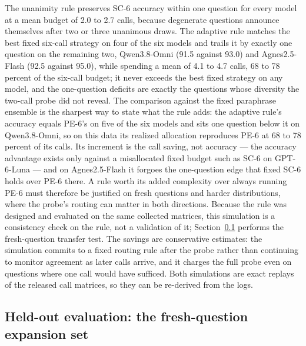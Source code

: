 The unanimity rule preserves SC-6 accuracy within one question for every model at a mean budget of 2.0 to 2.7 calls, because degenerate questions announce themselves after two or three unanimous draws. The adaptive rule matches the best fixed six-call strategy on four of the six models and trails it by exactly one question on the remaining two, Qwen3.8-Omni (91.5 against 93.0) and Agnes2.5-Flash (92.5 against 95.0), while spending a mean of 4.1 to 4.7 calls, 68 to 78 percent of the six-call budget; it never exceeds the best fixed strategy on any model, and the one-question deficits are exactly the questions whose diversity the two-call probe did not reveal. The comparison against the fixed paraphrase ensemble is the sharpest way to state what the rule adds: the adaptive rule's accuracy equals PE-6's on five of the six models and sits one question below it on Qwen3.8-Omni, so on this data its realized allocation reproduces PE-6 at 68 to 78 percent of its calls. Its increment is the call saving, not accuracy --- the accuracy advantage exists only against a misallocated fixed budget such as SC-6 on GPT-6-Luna --- and on Agnes2.5-Flash it forgoes the one-question edge that fixed SC-6 holds over PE-6 there. A rule worth its added complexity over always running PE-6 must therefore be justified on fresh questions and harder distributions, where the probe's routing can matter in both directions. Because the rule was designed and evaluated on the same collected matrices, this simulation is a consistency check on the rule, not a validation of it; Section~\ref{sec:expand} performs the fresh-question transfer test. The savings are conservative estimates: the simulation commits to a fixed routing rule after the probe rather than continuing to monitor agreement as later calls arrive, and it charges the full probe even on questions where one call would have sufficed. Both simulations are exact replays of the released call matrices, so they can be re-derived from the logs.

\subsection{Held-out evaluation: the fresh-question expansion set}
\label{sec:expand}

